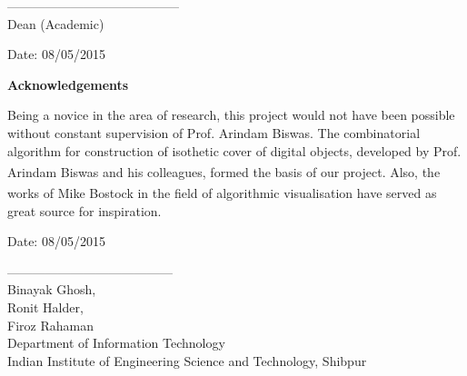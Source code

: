 \documentclass[12pt]{article}
\begin{document}
\begin{minipage}[t]{0.48\linewidth}
-----------------------------------------\\
Dean (Academic)
\end{minipage}\hfill
\begin{minipage}[t]{0.48\linewidth}
\begin{center}
Date: 08/05/2015
\end{center}
\end{minipage}




\newpage




\thispagestyle{empty}
\begin{center}
  \Huge \textbf{Acknowledgements}
\end{center}
\vspace{2cm}
Being a novice in the area of research, this project would not have been possible without constant
supervision of Prof. Arindam Biswas. The combinatorial algorithm for construction of isothetic cover of digital objects, developed by Prof. Arindam Biswas and his colleagues\textsuperscript{\cite{ref1}}, formed the basis of our project. Also, the works of Mike Bostock\textsuperscript{\cite{ref2}} in the field of algorithmic visualisation have served as great source for inspiration.\\
\vspace{2.5cm}

\begin{minipage}[t]{0.48\linewidth}
\begin{flushleft}
Date: 08/05/2015
\end{flushleft}
\end{minipage}\hfill
\begin{minipage}[t]{0.48\linewidth}
\begin{flushright}
---------------------------------------\\
Binayak Ghosh,\\
Ronit Halder,\\
Firoz Rahaman\\
Department of Information Technology\\
Indian Institute of Engineering Science and Technology, Shibpur
\end{flushright}
\end{minipage}




\newpage
\end{document}
